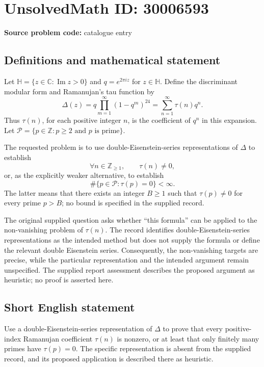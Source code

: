 \documentclass[11pt]{article}
\newcommand{\Z}{\mathbb{Z}}
\newcommand{\C}{\mathbb{C}}
\begin{document}
\section*{UnsolvedMath ID: 30006593}
\textbf{Source problem code:} catalogue entry
\subsection{Definitions and mathematical statement}
Let \(\mathbb H=\{z\in\C:\operatorname{Im}z>0\}\) and \(q=e^{2\pi i z}\) for \(z\in\mathbb H\). Define the discriminant modular form and Ramanujan's tau function by
\[
\Delta(z)=q\prod_{m=1}^{\infty}(1-q^m)^{24}
=\sum_{n=1}^{\infty}\tau(n)q^n.
\]
Thus \(\tau(n)\), for each positive integer \(n\), is the coefficient of \(q^n\) in this expansion. Let \(\mathcal P=\{p\in\Z:p\ge 2\text{ and }p\text{ is prime}\}\).

The requested problem is to use double-Eisenstein-series representations of \(\Delta\) to establish
\[
\forall n\in\Z_{\ge 1},\qquad \tau(n)\ne 0,
\]
or, as the explicitly weaker alternative, to establish
\[
\#\{p\in\mathcal P:\tau(p)=0\}<\infty.
\]
The latter means that there exists an integer \(B\ge 1\) such that \(\tau(p)\ne 0\) for every prime \(p>B\); no bound is specified in the supplied record.

The original supplied question asks whether ``this formula'' can be applied to the non-vanishing problem of \(\tau(n)\). The record identifies double-Eisenstein-series representations as the intended method but does not supply the formula or define the relevant double Eisenstein series. Consequently, the non-vanishing targets are precise, while the particular representation and the intended argument remain unspecified. The supplied report assessment describes the proposed argument as heuristic; no proof is asserted here.
\subsection{Short English statement}
Use a double-Eisenstein-series representation of \(\Delta\) to prove that every positive-index Ramanujan coefficient \(\tau(n)\) is nonzero, or at least that only finitely many primes have \(\tau(p)=0\). The specific representation is absent from the supplied record, and its proposed application is described there as heuristic.
\end{document}
